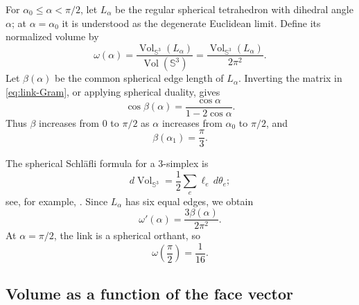 \documentclass[12pt,a4paper]{article}
\theoremstyle{thmstyleone}
\theoremstyle{thmstylethree}
\theoremstyle{thmstyletwo}
\newcommand{\SSph}{\mathbb S}
\newcommand{\Vol}{\operatorname{Vol}}
\begin{document}
For $\alpha_0\leq\alpha<\pi/2$, let $L_\alpha$ be the regular spherical
tetrahedron with dihedral angle $\alpha$; at $\alpha=\alpha_0$ it is
understood as the degenerate Euclidean limit.  Define its normalized volume
by
\begin{equation}\label{eq:omega-def}
 \omega(\alpha)=\frac{\Vol_{\SSph^3}(L_\alpha)}{\Vol(\SSph^3)}
 =\frac{\Vol_{\SSph^3}(L_\alpha)}{2\pi^2}.
\end{equation}
Let $\beta(\alpha)$ be the common spherical edge length of $L_\alpha$.
Inverting the matrix in \eqref{eq:link-Gram}, or applying spherical duality,
gives
\begin{equation}\label{eq:beta}
 \cos\beta(\alpha)=\frac{\cos\alpha}{1-2\cos\alpha}.
\end{equation}
Thus $\beta$ increases from $0$ to $\pi/2$ as $\alpha$ increases from
$\alpha_0$ to $\pi/2$, and
\begin{equation}\label{eq:beta-alpha1}
 \beta(\alpha_1)=\frac{\pi}{3}.
\end{equation}

The spherical Schl\"afli formula for a $3$-simplex is
\[
 d\Vol_{\SSph^3}=\frac12\sum_e \ell_e\,d\theta_e;
\]
see, for example, \cite{Milnor1994}.  Since $L_\alpha$ has six equal edges,
we obtain
\begin{equation}\label{eq:omega-derivative}
 \omega'(\alpha)=\frac{3\beta(\alpha)}{2\pi^2}.
\end{equation}
At $\alpha=\pi/2$, the link is a spherical orthant, so
\begin{equation}\label{eq:omega-endpoint}
 \omega\left(\frac{\pi}{2}\right)=\frac1{16}.
\end{equation}

\subsection{Volume as a function of the face vector}
\end{document}
